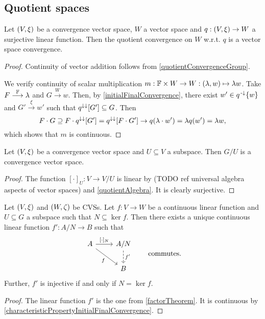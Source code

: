 \subsection{Quotient spaces}
\begin{proposition}
Let $\sSet{V, \xi}$ be a convergence vector space, $W$ a vector space and $q: \sSet{V, \xi} \to W$ a surjective linear function. Then the quotient convergence on $W$ w.r.t. $q$ is a vector space convergence.
\end{proposition}
\begin{proof}
Continuity of vector addition follows from
\ref{quotientConvergenceGroup}.

We verify continuity of scalar multiplication $m: \mathbb{F}\times W \to W: (\lambda, w) \mapsto \lambda w$. Take $F\overset{\mathbb{F}}{\longrightarrow}\lambda$ and $G \overset{W}{\longrightarrow} w$. Then, by \ref{initialFinalConvergence}, there exist $w'\in q^{{\text{\hspace{0.15em}-}\downarrow}}\{w\}$ and $G' \overset{\xi}{\longrightarrow} w'$ such that $q^{\downarrow\downarrow}[G'] \subseteq G$. Then
\[ F\cdot G \supseteq F\cdot q^{\downarrow\downarrow}[G'] = q^{\downarrow\downarrow}[F\cdot G'] \to q(\lambda \cdot w') = \lambda q(w') = \lambda w, \]
which shows that $m$ is continuous.
\end{proof}
\begin{corollary}
Let $\sSet{V,\xi}$ be a convergence vector space and $U\subseteq V$ a subspace. Then $G/U$ is a convergence vector space.
\end{corollary}
\begin{proof}
The function $[\cdot]_U: V\to V/U$ is linear by (TODO ref universal algebra aspects of vector spaces) and \ref{quotientAlgebra}. It is clearly surjective.
\end{proof}
\begin{corollary}
Let $\sSet{V, \xi}$ and $\sSet{W, \zeta}$ be CVSs. Let $f: V\to W$ be a continuous linear function and $U\subseteq G$ a subspace such that $N\subseteq \ker f$. Then there exists a unique continuous linear function $f': A/N \to B$ such that
\[ \begin{tikzcd}
A \arrow[r, "{[\cdot]_N}"] \arrow[dr, swap, "f"] & A/N \arrow[d, dashed, "{f'}"] \\
& B
\end{tikzcd} \qquad\text{commutes.} \]
Further, $f'$ is injective \textup{if and only if} $N = \ker f$.
\end{corollary}
\begin{proof}
The linear function $f'$ is the one from \ref{factorTheorem}. It is continuous by \ref{characteristicPropertyInitialFinalConvergence}.
\end{proof}

